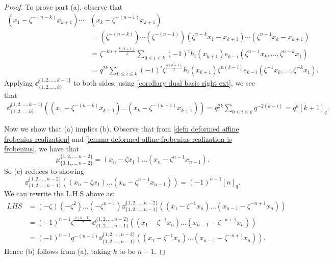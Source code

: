 \begin{proof}   
  To prove part (a), observe that 
  \begin{align*}(x_1-\zeta^{-(n-k)}x_{k+1})\cdots &(x_{k}-\zeta^{-(n-1)}x_{k+1})\\
  &= (\zeta^{-(n-k)})\cdots (\zeta^{-(n-1)})(\zeta^{n-k}x_1-x_{k+1})\cdots (\zeta^{n-1}x_k-x_{k+1}) \\
  &=\zeta^{-kn+\frac{k(k+1)}{2}}\sum_{0\leq i \leq k}(-1)^ih_i(x_{k+1})e_{k-i}(\zeta^{n-1}x_k, \ldots, \zeta^{n-k}x_1)\\
  &=q^{2k}\sum_{0 \leq i \leq k}(-1)^i\zeta^{\frac{k(k+1)}{2}}h_{i}(x_{k+1})\zeta^{n(k-i)}e_{k-i}(\zeta^{-1}x_k, \ldots, \zeta^{-k}x_1).
  \end{align*}
  Applying $\dd_{\{1,2, \ldots ,k\}}^{\{1,2, \ldots ,k-1\}}$ to both sides, using \cref{corollary dual basis right ext}, we see that
  \begin{align*}
    \dd_{\{1,2, \ldots ,k\}}^{\{1,2, \ldots ,k-1\}}\left((x_1-\zeta^{-(n-k)}x_{k+1})\ldots (x_{k}-\zeta^{-(n-1)}x_{k+1})\right)  
    =q^{2k}\sum_{0 \leq i \leq k}q^{-2(k-i)}=q^{k}[k+1]_q.
  \end{align*}
  
  Now we show that (a) implies (b).
    Observe that from \cref{defn deformed affine frobenius realization} and \cref{lemma deformed affine frobenius realization is frobenius}, we have that
    $$\mu_{\{0,1, \ldots ,n-2\}}^{\{1,2, \ldots ,n-2\}}=(x_n-\zeta x_1)\ldots (x_n-\zeta^{n-1} x_{n-1}).$$
    So (c) reduces to showing
    $$\dd_{\{1,2, \ldots ,n-1\}}^{\{1,2, \ldots ,n-2\}}((x_n-\zeta x_1)\ldots (x_n-\zeta^{n-1} x_{n-1}))=(-1)^{n-1}[n]_q.$$
    We can rewrite the L.H.S above as:
    \begin{align}       
   LHS &= (-\zeta)(-\zeta^2)\ldots (-\zeta^{n-1})\dd_{\{1,2, \ldots ,n-1\}}^{\{1,2, \ldots ,n-2\}}((x_1-\zeta^{-1}x_n)\ldots (x_{n-1}-\zeta^{-n+1}x_n)) \nonumber\\
   &= (-1)^{n-1}\zeta^{\frac{n(n-1)}{2}}\dd_{\{1,2, \ldots ,n-1\}}^{\{1,2, \ldots ,n-2\}}((x_1-\zeta^{-1}x_n)\ldots (x_{n-1}-\zeta^{-n+1}x_n))\nonumber\\
   &= (-1)^{n-1}q^{-(n-1)}\dd_{\{1,2, \ldots ,n-1\}}^{\{1,2, \ldots ,n-2\}}((x_1-\zeta^{-1}x_n)\ldots (x_{n-1}-\zeta^{-n+1}x_n)).\nonumber
   \end{align}
   Hence (b) follows from (a), taking $k$ to be $n-1$.


\end{proof}
